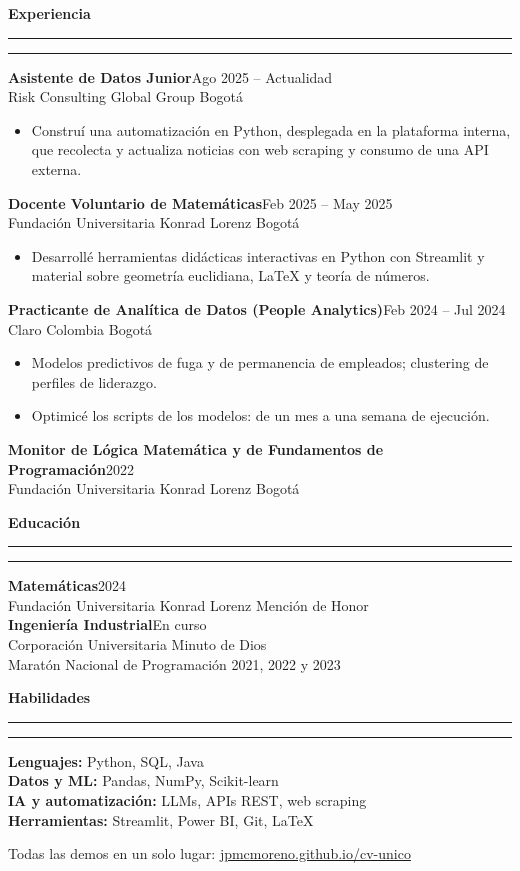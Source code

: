 \documentclass[10pt]{article}
\newcommand{\sitio}{jpmcmoreno.github.io/cv-unico}
\newcommand{\chance}[1]{%
  \href{https://\sitio/#1}{%
    \tcbox[on line,colback=accent,colframe=accentdark,boxrule=0.5pt,arc=6pt,
      left=5pt,right=5pt,top=1.6pt,bottom=1.6pt,boxsep=0pt,
      drop shadow={black!25,opacity=0.5}]{%
      \color{white}\bfseries\scriptsize Dale un chance ;)\;\(\blacktriangleright\)}%
  }%
}
\newcommand{\seccion}[1]{%
  \vspace{7pt}%
  {\color{ink}\bfseries\large #1}\\[-7pt]
  {\color{accent}\rule{2.2cm}{1.6pt}}{\color{ink!20}\rule{\dimexpr\linewidth-2.2cm}{0.4pt}}\par
  \vspace{4pt}%
}
\newcommand{\cargo}[3]{%
  {\color{ink}\bfseries #1}\hfill{\color{soft}\small #3}\\
  {\color{soft}\small #2}\par\vspace{1pt}%
}
\begin{document}
\seccion{Experiencia}
\cargo{Asistente de Datos Junior}{Risk Consulting Global Group \textperiodcentered{} Bogotá}{Ago 2025 -- Actualidad}
\begin{itemize}
  \item Construí una automatización en Python, desplegada en la plataforma interna, que recolecta y
        actualiza noticias con web scraping y consumo de una API externa.
        \chance{demos/scraping/}
\end{itemize}
\vspace{3pt}
\cargo{Docente Voluntario de Matemáticas}{Fundación Universitaria Konrad Lorenz \textperiodcentered{} Bogotá}{Feb 2025 -- May 2025}
\begin{itemize}
  \item Desarrollé herramientas didácticas interactivas en Python con Streamlit y material sobre
        geometría euclidiana, \LaTeX{} y teoría de números.
        \chance{demos/euclides/}
\end{itemize}
\vspace{3pt}
\cargo{Practicante de Analítica de Datos (People Analytics)}{Claro Colombia \textperiodcentered{} Bogotá}{Feb 2024 -- Jul 2024}
\begin{itemize}
  \item Modelos predictivos de fuga y de permanencia de empleados; clustering de perfiles de liderazgo.
  \item Optimicé los scripts de los modelos: de un mes a una semana de ejecución.
\end{itemize}
\vspace{3pt}
\cargo{Monitor de Lógica Matemática y de Fundamentos de Programación}{Fundación Universitaria Konrad Lorenz \textperiodcentered{} Bogotá}{2022}

\begin{minipage}[t]{0.47\linewidth}
\seccion{Educación}
{\color{ink}\bfseries Matemáticas}\hfill{\color{soft}\small 2024}\\
{\color{soft}\small Fundación Universitaria Konrad Lorenz \textperiodcentered{} Mención de Honor}\\[3pt]
{\color{ink}\bfseries Ingeniería Industrial}\hfill{\color{soft}\small En curso}\\
{\color{soft}\small Corporación Universitaria Minuto de Dios}\\[3pt]
{\small Maratón Nacional de Programación 2021, 2022 y 2023}
\end{minipage}\hfill
\begin{minipage}[t]{0.49\linewidth}
\seccion{Habilidades}
{\small
\textbf{Lenguajes:} Python, SQL, Java\\[1.5pt]
\textbf{Datos y ML:} Pandas, NumPy, Scikit-learn\\[1.5pt]
\textbf{IA y automatización:} LLMs, APIs REST, web scraping\\[1.5pt]
\textbf{Herramientas:} Streamlit, Power BI, Git, \LaTeX}
\end{minipage}

\vfill
\begin{center}
{\color{soft}\scriptsize Todas las demos en un solo lugar:
\href{https://\sitio/}{\ttfamily \sitio}}
\end{center}
\end{document}
